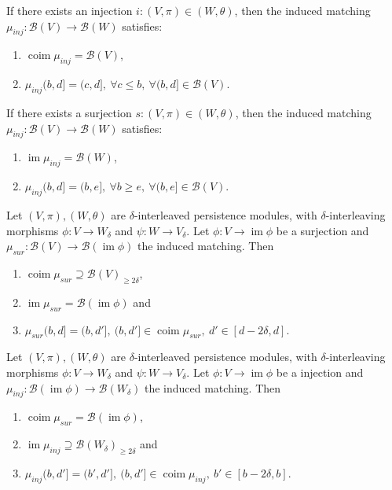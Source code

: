 \begin{lemma}
    If there exists an injection $i: (V, \pi) \in (W, \theta) $, then the induced matching $ \mu_{inj}: \mathcal B(V) \to \mathcal B (W) $ satisfies:
    \begin{enumerate}
        \item $\operatorname{coim} \mu_{inj} = \mathcal B(V)$,
        \item $\mu_{inj}(b, d] = (c, d], \ \forall c \leq b, \ \forall (b, d] \in \mathcal B(V)$.
    \end{enumerate}
\end{lemma}

\begin{lemma}
    If there exists a surjection $s: (V, \pi) \in (W, \theta) $, then the induced matching $ \mu_{inj}: \mathcal B(V) \to \mathcal B (W) $ satisfies:
    \begin{enumerate}
        \item $\operatorname{im} \mu_{inj} = \mathcal B(W)$,
        \item $\mu_{inj}(b, d] = (b, e], \ \forall b \geq e, \ \forall (b, e] \in \mathcal B(V)$.
    \end{enumerate}
\end{lemma}

\begin{lemma}
    Let $ (V, \pi), (W, \theta) $ are $\delta$-interleaved persistence modules, with $\delta$-interleaving morphisms $ \phi: V \to W_\delta $ and $ \psi: W \to V_\delta $. Let $ \phi: V \to \operatorname{im}\phi $ be a surjection and $ \mu_{sur}: \mathcal B(V) \to \mathcal B (\operatorname{im} \phi)$ the induced matching. Then
    \begin{enumerate}
        \item $\operatorname{coim} \mu_{sur} \supseteq \mathcal B (V)_{\geq 2\delta} $,
        \item $ \operatorname{im} \mu_{sur} = \mathcal B (\operatorname{im} \phi)$ and
        \item $ \mu_{sur}(b, d] = (b, d'], \ (b, d'] \in \operatorname{coim} \mu_{sur}, \ d' \in [d-2\delta, d]$.
    \end{enumerate}
\end{lemma}

\begin{lemma}
    Let $ (V, \pi), (W, \theta) $ are $\delta$-interleaved persistence modules, with $\delta$-interleaving morphisms $ \phi: V \to W_\delta $ and $ \psi: W \to V_\delta $. Let $ \phi: V \to \operatorname{im}\phi $ be a injection and $ \mu_{inj}: \mathcal B(\operatorname{im} \phi) \to \mathcal B (W_\delta)$ the induced matching. Then
    \begin{enumerate}
        \item $\operatorname{coim} \mu_{sur} = \mathcal B (\operatorname{im} \phi) $,
        \item $ \operatorname{im} \mu_{inj} \supseteq \mathcal B (W_\delta)_{\geq 2\delta} $ and
        \item $ \mu_{inj}(b, d'] = (b', d'], \ (b, d'] \in \operatorname{coim} \mu_{inj}, \ b' \in [b-2\delta, b]$.
    \end{enumerate}
\end{lemma}

